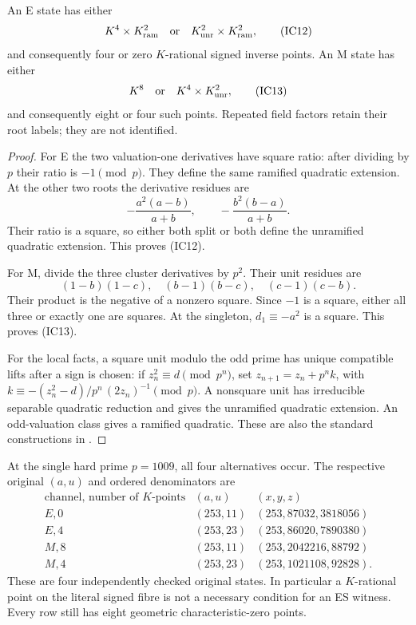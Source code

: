 \begin{theorem}\label{thm:fields}
An E state has either
\[
 K^4\times K_{\rm ram}^2
 \quad\text{or}\quad K_{\rm unr}^2\times K_{\rm ram}^2,
                                                                  \tag{IC12}
\]
and consequently four or zero $K$-rational signed inverse points.
An M state has either
\[
 K^8\quad\text{or}\quad K^4\times K_{\rm unr}^2,          \tag{IC13}
\]
and consequently eight or four such points. Repeated field factors retain their
root labels; they are not identified.
\end{theorem}
\begin{proof}
For E the two valuation-one derivatives have square ratio: after dividing by
$p$ their ratio is $-1\pmod p$. They define the same ramified quadratic extension.
At the other two roots the derivative residues are
\[
 -\frac{a^2(a-b)}{a+b},\qquad -\frac{b^2(b-a)}{a+b}.
\]
Their ratio is a square, so either both split or both define the unramified
quadratic extension. This proves (IC12).

For M, divide the three cluster derivatives by $p^2$. Their unit residues are
\[
 (1-b)(1-c),\quad(b-1)(b-c),\quad(c-1)(c-b).              \tag{IC14}
\]
Their product is the negative of a nonzero square. Since $-1$ is a square,
either all three or exactly one are squares. At the singleton,
$d_1\equiv-a^2$ is a square. This proves (IC13).

For the local facts, a square unit modulo the odd prime has unique compatible
lifts after a sign is chosen: if $z_n^2\equiv d\pmod{p^n}$, set
$z_{n+1}=z_n+p^nk$, with
$k\equiv-(z_n^2-d)/p^n\,(2z_n)^{-1}\pmod p$.
A nonsquare unit has irreducible separable quadratic reduction and gives the
unramified quadratic extension. An odd-valuation class gives a ramified
quadratic. These are also the standard constructions in
\cite[Chapter 7, Newton's lemma and local extensions]{Milne}.
\end{proof}

At the single hard prime $p=1009$, all four alternatives occur. The respective
original $(a,u)$ and ordered denominators are
\[
\begin{array}{c|c|c}
\text{channel, number of }K\text{-points}&(a,u)&(x,y,z)\\\hline
E,0&(253,11)&(253,87032,3818056)\\
E,4&(253,23)&(253,86020,7890380)\\
M,8&(253,11)&(253,2042216,88792)\\
M,4&(253,23)&(253,1021108,92828).
\end{array}                                                   \tag{IC15}
\]
These are four independently checked original states. In particular a
$K$-rational point on the literal signed fibre is not a necessary condition for
an ES witness. Every row still has eight geometric characteristic-zero points.

